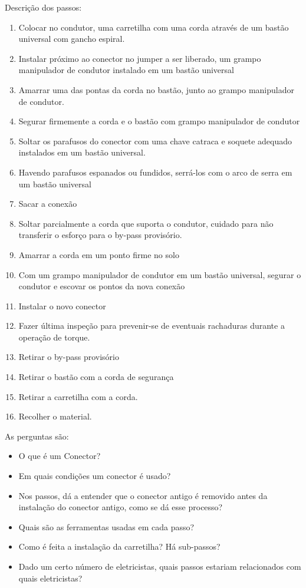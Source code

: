Descrição dos passos:

\begin{enumerate}
\item Colocar no condutor, uma carretilha com uma corda através de um bastão universal com gancho espiral.
\item Instalar próximo ao conector no jumper a ser liberado, um grampo manipulador de condutor instalado em um bastão universal
\item Amarrar uma das pontas da corda no bastão, junto ao grampo manipulador de condutor.
\item Segurar firmemente a corda e o bastão com grampo manipulador de condutor
\item Soltar os parafusos do conector com uma chave catraca e soquete adequado instalados em um bastão universal.
\item Havendo parafusos espanados ou fundidos, serrá-los com o arco de serra em um bastão universal
\item Sacar a conexão
\item Soltar parcialmente a corda que suporta o condutor, cuidado para não transferir o esforço para o by-pass provisório.
\item Amarrar a corda em um ponto firme no solo
\item Com um grampo manipulador de condutor em um bastão universal, segurar o condutor e escovar os pontos da nova conexão
\item Instalar o novo conector
\item Fazer última inspeção para prevenir-se de eventuais rachaduras durante a operação de torque.
\item Retirar o by-pass provisório
\item Retirar o bastão com a corda de segurança
\item Retirar a carretilha com a corda.
\item Recolher o material.
\end{enumerate}

As perguntas são:
\begin{itemize}
\item O que é um Conector?
\item Em quais condições um conector é usado?
\item Nos passos, dá a entender que o conector antigo é removido antes da instalação do conector antigo, como se dá esse processo?
\item Quais são as ferramentas usadas em cada passo?
\item Como é feita a instalação da carretilha? Há sub-passos?
\item Dado um certo número de eletricistas, quais passos estariam relacionados com quais eletricistas?
\end{itemize}

